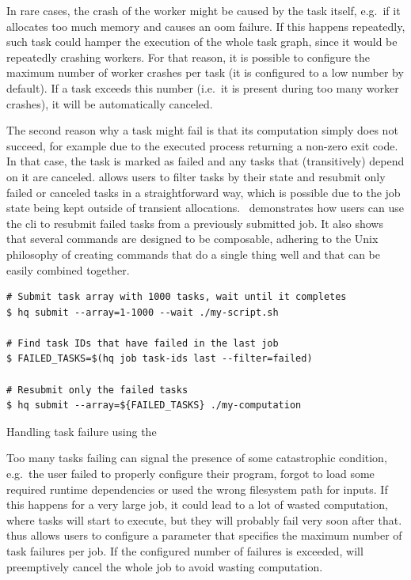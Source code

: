 In rare cases, the crash of the worker might be caused by the task itself, e.g.\ if it allocates
too much memory and causes an \gls{oom} failure. If this happens repeatedly, such
task could hamper the execution of the whole task graph, since it would be repeatedly crashing
workers. For that reason, it is possible to configure the maximum number of worker crashes per task
(it is configured to a low number by default). If a task exceeds this number (i.e.\ it is present
during too many worker crashes), it will be automatically canceled.

The second reason why a task might fail is that its computation simply does not succeed, for
example due to the executed process returning a non-zero exit code. In that case, the task is
marked as failed and any tasks that (transitively) depend on it are canceled.
\hyperqueue{} allows users to filter tasks by their state and resubmit only failed or
canceled tasks in a straightforward way, which is possible due to the job state being kept outside
of transient allocations.~ demonstrates how users can use the
\hq{} \gls{cli} to resubmit failed tasks from a previously
submitted job. It also shows that several \hq{} commands are designed to be
composable, adhering to the Unix philosophy of creating commands that do a single thing well and
that can be easily combined together.

\begin{listing}[h]
	\begin{verbatim}
# Submit task array with 1000 tasks, wait until it completes
$ hq submit --array=1-1000 --wait ./my-script.sh

# Find task IDs that have failed in the last job
$ FAILED_TASKS=$(hq job task-ids last --filter=failed)

# Resubmit only the failed tasks
$ hq submit --array=${FAILED_TASKS} ./my-computation
	\end{verbatim}
	\caption{Handling task failure using the \hyperqueue{} }
	\label{lst:hq-cli-fault-tolerance}
\end{listing}

Too many tasks failing can signal the presence of some catastrophic condition, e.g.\ the user
failed to properly configure their program, forgot to load some required runtime dependencies or
used the wrong filesystem path for inputs. If this happens for a very large job, it could lead to a
lot of wasted computation, where tasks will start to execute, but they will probably fail very soon
after that. \hyperqueue{} thus allows users to configure a parameter that specifies the
maximum number of task failures per job. If the configured number of failures is exceeded,
\hq{} will preemptively cancel the whole job to avoid wasting computation.


